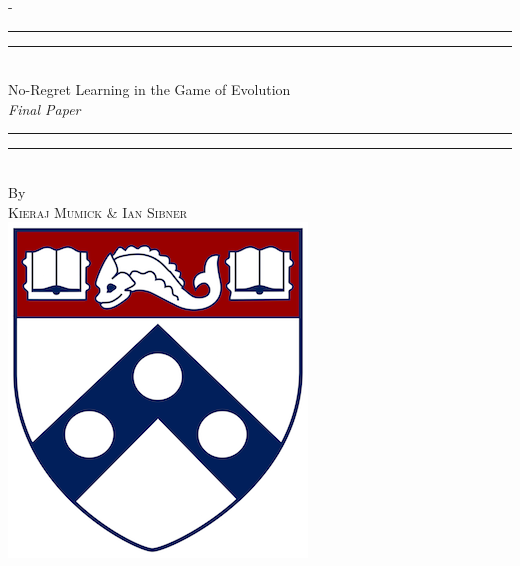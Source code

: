 %
%
% 
%
%
\begin{titlingpage}
\begin{SingleSpace}
\calccentering{\unitlength} 
\begin{adjustwidth*}{\unitlength}{-\unitlength}
\vspace*{13mm}
\begin{center}
\rule[0.5ex]{\linewidth}{2pt}\vspace*{-\baselineskip}\vspace*{3.2pt}
\rule[0.5ex]{\linewidth}{1pt}\\[\baselineskip]
{\HUGE No-Regret Learning in the Game of Evolution }\\[4mm]
{\Large \textit{Final Paper}}\\
\rule[0.5ex]{\linewidth}{1pt}\vspace*{-\baselineskip}\vspace{3.2pt}
\rule[0.5ex]{\linewidth}{2pt}\\
\vspace{6.5mm}
{\large By}\\
\vspace{6.5mm}
{\large\textsc{Kieraj Mumick \& Ian Sibner}}\\
\vspace{11mm}
\includegraphics[scale=0.6]{logos/upenn_shield_colour}\\

\end{center}
\end{adjustwidth*}
\end{SingleSpace}
\end{titlingpage}
